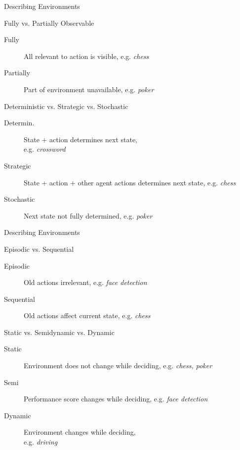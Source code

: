 \documentclass[14pt]{beamer}
\begin{document}
\begin{frame}{Describing Environments}
	\begin{block}{Fully vs. Partially Observable}
		\begin{description}
			\item[Fully] All relevant to action is visible, e.g. \textit{chess}
			\item[Partially] Part of environment unavailable, e.g. \textit{poker}
		\end{description}
	\end{block}
	\begin{block}{Deterministic vs. Strategic vs. Stochastic}
		\begin{description}
			\item[Determin.] State + action determines next state, \\ e.g. \textit{crossword}
			\item[Strategic] State + action + other agent actions determines next state, e.g. \textit{chess}
			\item[Stochastic] Next state not fully determined, e.g. \textit{poker}
		\end{description}
	\end{block}
\end{frame}
\begin{frame}{Describing Environments}
	\begin{block}{Episodic vs. Sequential}
		\begin{description}
			\item[Episodic] Old actions irrelevant, e.g. \textit{face detection}
			\item[Sequential] Old actions affect current state, e.g. \textit{chess}
		\end{description}
	\end{block}
	\begin{block}{Static vs. Semidynamic vs. Dynamic}
		\begin{description}
			\item[Static] Environment does not change while deciding, e.g. \textit{chess, poker}
			\item[Semi] Performance score changes while deciding, e.g. \textit{face detection}
			\item[Dynamic] Environment changes while deciding, \\ e.g. \textit{driving}
		\end{description}
	\end{block}
\end{frame}
\end{document}
